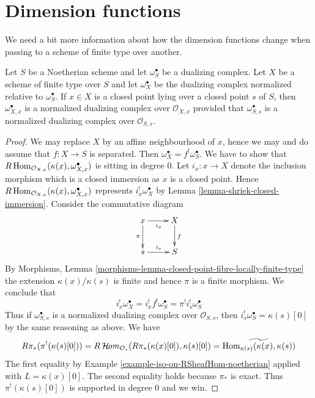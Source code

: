 \section{Dimension functions}
\label{section-dimension-functions}

\noindent
We need a bit more information about how the dimension functions change
when passing to a scheme of finite type over another.

\begin{lemma}
\label{lemma-good-dualizing-normalized}
Let $S$ be a Noetherian scheme and let $\omega_S^\bullet$ be a
dualizing complex. Let $X$ be a scheme of finite type over $S$ and let
$\omega_X^\bullet$ be the dualizing complex normalized relative
to $\omega_S^\bullet$. If $x \in X$ is a closed point lying over
a closed point $s$ of $S$, then $\omega_{X, x}^\bullet$
is a normalized dualizing complex over $\mathcal{O}_{X, x}$
provided that $\omega_{S, s}^\bullet$ is a normalized dualizing
complex over $\mathcal{O}_{S, s}$.
\end{lemma}

\begin{proof}
We may replace $X$ by an affine neighbourhood of $x$, hence we may
and do assume that $f : X \to S$ is separated.
Then $\omega_X^\bullet = f^!\omega_S^\bullet$. We have to show that
$R\mathop{\mathrm{Hom}}\nolimits_{\mathcal{O}_{X, x}}(\kappa(x), \omega_{X, x}^\bullet)$
is sitting in degree $0$. Let $i_x : x \to X$ denote the inclusion
morphism which is a closed immersion as $x$ is a closed point.
Hence $R\mathop{\mathrm{Hom}}\nolimits_{\mathcal{O}_{X, x}}(\kappa(x), \omega_{X, x}^\bullet)$
represents $i_x^!\omega_X^\bullet$ by
Lemma \ref{lemma-shriek-closed-immersion}.
Consider the commutative diagram
$$
\xymatrix{
x \ar[r]_{i_x} \ar[d]_\pi & X \ar[d]^f \\
s \ar[r]^{i_s} & S
}
$$
By Morphisms, Lemma
\ref{morphisms-lemma-closed-point-fibre-locally-finite-type}
the extension $\kappa(x)/\kappa(s)$ is finite and hence
$\pi$ is a finite morphism. We conclude that
$$
i_x^!\omega_X^\bullet = i_x^! f^! \omega_S^\bullet =
\pi^! i_s^! \omega_S^\bullet
$$
Thus if $\omega_{S, s}^\bullet$ is a normalized dualizing complex
over $\mathcal{O}_{S, s}$, then $i_s^!\omega_S^\bullet = \kappa(s)[0]$
by the same reasoning as above. We have
$$
R\pi_*(\pi^!(\kappa(s)[0])) =
R\mathop{\mathcal{H}\!\mathit{om}}\nolimits_{\mathcal{O}_s}(R\pi_*(\kappa(x)[0]), \kappa(s)[0]) =
\widetilde{\mathop{\mathrm{Hom}}\nolimits_{\kappa(s)}(\kappa(x), \kappa(s))}
$$
The first equality by Example \ref{example-iso-on-RSheafHom-noetherian}
applied with $L = \kappa(x)[0]$. The second equality holds because
$\pi_*$ is exact.
Thus $\pi^!(\kappa(s)[0])$ is supported in degree $0$ and we win.
\end{proof}

